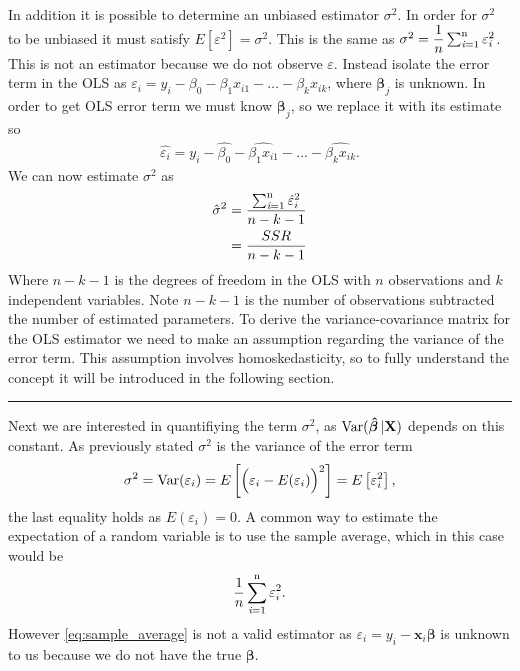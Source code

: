 In addition it is possible to determine an unbiased estimator $\sigma^2$. In order for $\sigma^2$ to be unbiased it must satisfy $E[\varepsilon^2] = \sigma^2$.  This is the same as $\sigma^2 = \dfrac{1}{n}\operatorname{\sum_{\textit{i}=1}^n} \varepsilon_i^2$. This is not an estimator because we do not observe $\varepsilon$. Instead isolate the error term in the OLS as $\varepsilon_i = y_i - \beta_0 - \beta_1x_{i1} - \ldots - \beta_kx_{ik}$, where $\mathbf{\beta}_j$ is unknown. In order to get OLS error term we must know $\mathbf{\beta}_j$, so we replace it with its estimate so
\begin{align*}
     \hat{\varepsilon_i} = y_i - \hat{\beta_0} - \hat{\beta_1x_{i1}} - \ldots - \hat{\beta_kx_{ik}}.
\end{align*}
We can now estimate $\sigma^2$ as
\begin{align}\label{eq:OLS_estimate_sigma_i_anden}
    \hat{\sigma}^2 &= \dfrac{\operatorname{\sum_{\textit{i}=1}^n} \hat{\varepsilon}^2_i}{n-k-1}\nonumber \\
    &= \dfrac{SSR}{n-k-1}
\end{align}
Where $n-k-1$ is the degrees of freedom in the OLS with $n$ observations and $k$ independent variables. Note $n-k-1$ is the number of observations subtracted the number of estimated parameters. 
To derive the variance-covariance matrix for the OLS estimator we need to make an assumption regarding the variance of the error term. 
This assumption involves homoskedasticity, so to fully understand the concept it will be introduced in the following section.
\vspace{5mm}
\hrule
\vspace{5mm}
Next we are interested in  quantifiying the term $\sigma^2$, as $\operatorname{\text{Var}}(\operatorname{\boldsymbol{\hat{\beta}}}|\mathbf{X})$ depends on this constant.
As previously stated $\sigma^2$ is the variance of the error term
\begin{align*}
    \sigma^2 = \operatorname{\text{Var}}(\varepsilon_i) =  E\left[\Big(\varepsilon_i - E(\varepsilon_i)\Big)^2\right] = E\left[\varepsilon_i^2\right],
\end{align*}
the last equality holds as $E(\varepsilon_i) = 0$.
A common way to estimate the expectation of a random variable is to use the sample average, which in this case would be
\begin{align}\label{eq:sample_average}
    \dfrac{1}{n}\operatorname{\sum_{\textit{i}=1}^n} \varepsilon_i^2.
\end{align}
However \eqref{eq:sample_average} is not a valid estimator as $\varepsilon_i = y_i - \mathbf{x}_i\boldsymbol{\beta}$ is unknown to us because we do not have the true $\boldsymbol{\beta}$.
